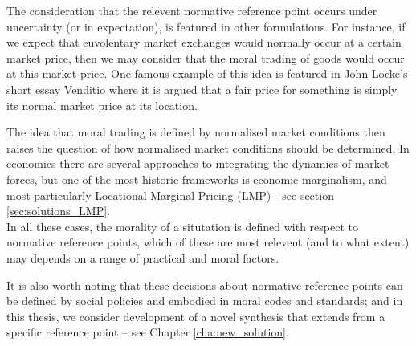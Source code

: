 The consideration that the relevent normative reference point occurs under uncertainty (or in expectation), is featured in other formulations.
For instance, if we expect that euvolentary market exchanges would normally occur at a certain market price, then we may consider that the moral trading of goods would occur at this market price.
One famous example of this idea is featured in John Locke's short essay Venditio \cite{locke2003locke} where it is argued that a fair price for something is simply its normal market price at its location.

The idea that moral trading is defined by normalised market conditions then raises the question of how normalised market conditions should be determined,
In economics there are several approaches to integrating the dynamics of market forces, but one of the most historic frameworks is economic marginalism, and most particularly Locational Marginal Pricing (LMP) - see section \ref{sec:solutions_LMP}.\\


In all these cases, the morality of a situtation is defined with respect to normative reference points, which of these are most relevent (and to what extent) may depends on a range of practical and moral factors.

It is also worth noting that these decisions about normative reference points can be defined by social policies %
 and embodied in moral codes and standards; and in this thesis, we consider development of a novel synthesis that extends from a specific reference point -- see Chapter \ref{cha:new_solution}. 




